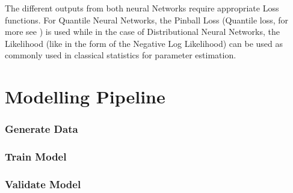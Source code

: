 The different outputs from both neural Networks require appropriate Loss functions. For Quantile Neural Networks, the Pinball Loss (Quantile loss, for more see \cite{Steinwart_2011}) is used while in the case of Distributional Neural Networks, the Likelihood (like in the form of the Negative Log Likelihood)  can be used as commonly used in classical statistics for parameter estimation. 

\cite{Akpabio} \cite{Marcjasz_2023}

\section{Modelling Pipeline}

\subsubsection{Generate Data}

\subsubsection{Train Model}

\subsubsection{Validate Model}
